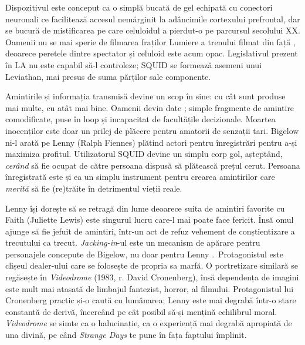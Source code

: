 \documentclass[12pt]{article}
\begin{document}
{Dispozitivul este conceput ca o simplă bucată de gel echipată cu conectori neuronali ce facilitează accesul nemărginit la adâncimile cortexului prefrontal, dar se bucură de mistificarea pe care celuloidul a pierdut-o pe parcursul secolului XX. Oamenii nu se mai sperie de filmarea fraților Lumiere a trenului filmat din față \cite{Willistein1995a}, deoarece peretele dintre spectator și celuloid este acum opac. Legislativul prezent în LA nu este capabil să-l controleze; SQUID se formează asemeni unui Leviathan, mai presus de suma părților sale componente.\par

Amintirile și informația transmisă devine un scop în sine: cu cât sunt produse mai multe, cu atât mai bine. Oamenii devin date \cite{Vishnevetsky2012a}; simple fragmente de amintire comodificate, puse în loop și incapacitat de facultățile decizionale. Moartea inocenților este doar un prilej de plăcere pentru amatorii de senzații tari. Bigelow ni-l arată pe Lenny (Ralph Fiennes) plătind actori pentru înregistrări pentru a-și maximiza profitul. Utilizatorul SQUID devine un simplu corp gol, așteptând, \textit{cerând} să fie ocupat de către persoana dispusă să plătească prețul cerut. Persoana înregistrată este și ea un simplu instrument pentru crearea amintirilor care \textit{merită} să fie (re)trăite în detrimentul vieții reale.\par

Lenny își dorește să se retragă din lume deoarece suita de amintiri favorite cu Faith (Juliette Lewis) este singurul lucru care-l mai poate face fericit. Însă omul ajunge să fie jefuit de amintiri, într-un act de refuz vehement de conștientizare a trecutului ca trecut. \textit{Jacking-in}-ul este un mecanism de apărare pentru personajele concepute de Bigelow, nu doar pentru Lenny \cite{Palermo2020a}. Protagonistul este clișeul dealer-ului care se folosește de propria sa marfă. O portretizare similară se regăsește în \textit{Videodrome} (1983, r. David Cronenberg), însă dependența de imagini este mult mai atașată de limbajul fantezist, horror, al filmului. Protagonistul lui Cronenberg practic și-o caută cu lumânarea; Lenny este mai degrabă într-o stare constantă de derivă, încercând pe cât posibil să-și mențină echilibrul moral. \textit{Videodrome} se simte ca o halucinație, ca o experiență mai degrabă apropiată de una divină, pe când \textit{Strange Days} te pune în fața faptului împlinit.\par

}
\end{document}

